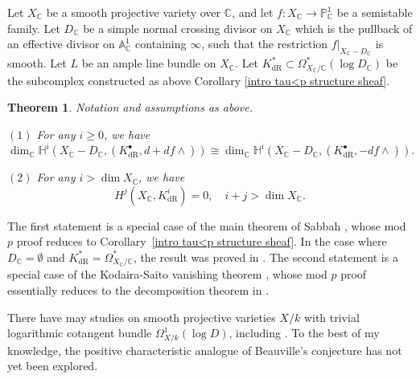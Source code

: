 \documentclass[12pt, a4paper]{article}
\newtheorem{theorem}{Theorem}[section]
\begin{document}
Let $X_\mathbb{C}$ be a smooth projective variety over $\mathbb{C}$, and let $f: X_\mathbb{C} \to \mathbb{P}^1_\mathbb{C}$ be a semistable family. Let $D_\mathbb{C}$ be a simple normal crossing divisor on $X_\mathbb{C}$ which is the pullback of an effective divisor on $\mathbb{A}^1_\mathbb{C}$ containing $\infty$, such that the restriction $f|_{X_\mathbb{C} - D_\mathbb{C}}$ is smooth. Let $L$ be an ample line bundle on $X_\mathbb{C}$. Let $K^*_\mathrm{dR}\subset\Omega^*_{X_\mathbb C/\mathbb C}(\log D_\mathbb C)$ be the subcomplex constructed as above Corollary \ref{intro tau<p structure sheaf}.
\begin{theorem}
Notation and assumptions as above. 

$(1)$ For any $i\geq0$, we have
$$
\dim_\mathbb C\mathbb H^i(X_\mathbb C-D_\mathbb C,(K^\bullet_\mathrm{dR},d+df\wedge))\cong \dim_\mathbb C\mathbb H^i(X_\mathbb C-D_\mathbb C,(K^\bullet_\mathrm{dR},-df\wedge)).$$

$(2)$ For any $i>\dim X_\mathbb C$, we have
$$
H^j(X_\mathbb C,K^i_\mathrm{dR})=0,\quad i+j>\dim X_\mathbb C.
$$
\end{theorem}
The first statement is a special case of the main theorem of Sabbah \cite{Sah1}, whose mod~$p$ proof reduces to Corollary~\ref{intro tau<p structure sheaf}. In the case where $D_\mathbb{C} = \emptyset$ and $K^*_{\mathrm{dR}} = \Omega^*_{X_\mathbb{C}/\mathbb{C}}$, the result was proved in \cite{OV}. The second statement is a special case of the Kodaira-Saito vanishing theorem \cite{Saito}, whose mod $p$ proof essentially reduces to the decomposition theorem in \cite[Appendix D]{ESY}.














\iffalse
There have may studies on smooth projective varieties $X/k$ with trivial logarithmic cotangent bundle $\Omega^1_{X/k}(\log D)$, including \cite{MS, Li, J, ACH}. To the best of my knowledge, the positive characteristic analogue of Beauville's conjecture has not yet been explored.
\end{document}
